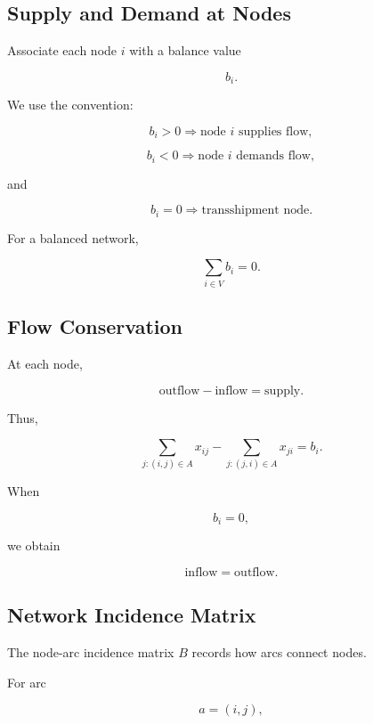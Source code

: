 \subsection{Supply and Demand at Nodes}
\label{subsec:network-supply-demand}

Associate each node \(i\) with a balance value

\[
b_i.
\]

We use the convention:

\[
\boxed{
b_i>0
\Rightarrow
\text{node }i\text{ supplies flow},
}
\]

\[
\boxed{
b_i<0
\Rightarrow
\text{node }i\text{ demands flow},
}
\]

and

\[
\boxed{
b_i=0
\Rightarrow
\text{transshipment node}.
}
\]

For a balanced network,

\[
\boxed{
\sum_{i\in V}
b_i=0.
}
\]

\subsection{Flow Conservation}
\label{subsec:flow-conservation}

At each node,

\[
\boxed{
\text{outflow}
-
\text{inflow}
=
\text{supply}.
}
\]

Thus,

\[
\boxed{
\sum_{j:(i,j)\in A}
x_{ij}
-
\sum_{j:(j,i)\in A}
x_{ji}
=
b_i.
}
\]

When

\[
b_i=0,
\]

we obtain

\[
\boxed{
\text{inflow}
=
\text{outflow}.
}
\]

\subsection{Network Incidence Matrix}
\label{subsec:network-incidence-matrix}

The node-arc incidence matrix \(B\) records how arcs connect nodes.

For arc

\[
a=(i,j),
\]

